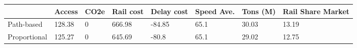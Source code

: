 \begin{tabular}{llllllll}
& Access & CO2e & Rail cost & Delay cost & Speed Ave. & Tons (M) & Rail Share Market \\ 
\hline 
Path-based & 128.38 & 0 & 666.98 & -84.85 & 65.1 & 30.03 & 13.19 \\ 
Proportional & 125.27 & 0 & 645.69 & -80.8 & 65.1 & 29.02 & 12.75 \\ 
\hline 
\end{tabular}